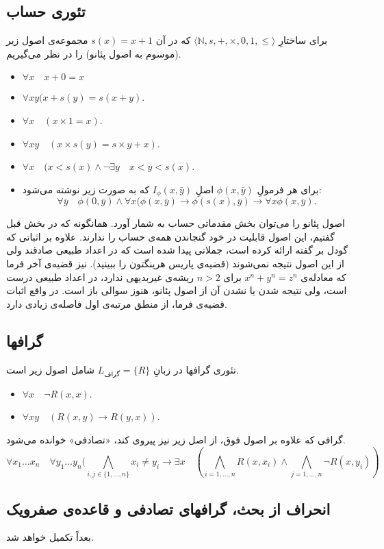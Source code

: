 \documentclass[12pt,a4paper]{report}
\theoremstyle{colorhead}
\begin{document}
\subsection{تئوری حساب}
برای ساختارِ
$\langle \mathbb{N},s,+,\times,0,1,\leq\rangle$
که در آن
$s(x)=x+1$
مجموعه‌ی اصول زیر (موسوم به اصول پئانو) را در نظر می‌گیریم.
\begin{itemize}
\item 
$\forall x\quad x+0=x$
\item 
$\forall xy (x+s(y)=s(x+y)$.
\item 
$\forall x \quad (x\times 1=x)$.
\item 
$\forall xy \quad (x\times s(y)=s\times y+x)$.
\item 
$\forall x \quad (x<s(x) \wedge \neg \exists y \quad x<y<s(x)$.
\item 
برای هر فرمولِ
$\phi(x,\bar{y})$
اصلِ
$I_\phi(x,\bar{y})$
که به صورت زیر نوشته می‌شود:
\[
\forall \bar{y}\quad \phi(0,\bar{y})\wedge \forall x (\phi(x,\bar{y})\to \phi(s(x),\bar{y})\to \forall x\phi(x,\bar{y}).
\]
\end{itemize}
اصول پئانو را می‌توان بخش مقدماتی حساب به شمار آورد. همانگونه که در بخش قبل گفتیم، این اصول قابلیت در خود گنجاندن همه‌ی حساب را ندارند. علاوه بر
اثباتی که گودل بر گفته ارائه کرده است، جملاتی پیدا شده است که در
اعداد طبیعی صادقند ولی از این اصول نتیجه نمی‌شوند (قضیه‌ی پاریس هرینگتون را ببینید). نیز قضیه‌ی آخر فرما که  معادله‌ی
$x^n+y^n=z^n$
برای
$n>2$
ریشه‌‌ی غیربدیهی ندارد، در اعداد طبیعی درست است، ولی نتیجه شدن یا نشدن آن از اصول پئانو، هنوز سوالی باز است. 
در واقع اثبات قضیه‌ی فرما، از منطق مرتبه‌ی اول فاصله‌ی زیادی دارد.
\subsection{گرافها}
تئوری گرافها در 
زبانِ 
$L_{\text{گراف}}=\{R\}$
شامل اصول زیر است.
\begin{itemize}
\item 
$\forall x\quad \neg R(x,x)$.
\item 
$\forall xy\quad (R(x,y)\to R(y,x))$.
\end{itemize}
گرافی که علاوه بر اصول فوق، از اصل زیر نیز پیروی کند، «تصادفی» خوانده می‌شود. 
\[
\forall x_1\ldots x_n\quad \forall y_1\ldots y_n 
(\bigwedge_{i,j\in \{1,\ldots,n\}} x_i\not=y_i\to \exists x \quad (\bigwedge_{i=1,\ldots,n} R(x,x_i)\wedge \bigwedge_{j=1,\ldots,n} \neg R(x,y_i))\]
\subsection{انحراف از بحث، گرافهای تصادفی و قاعده‌ی صفرویک}
بعداً تکمیل خواهد شد.
\end{document}
